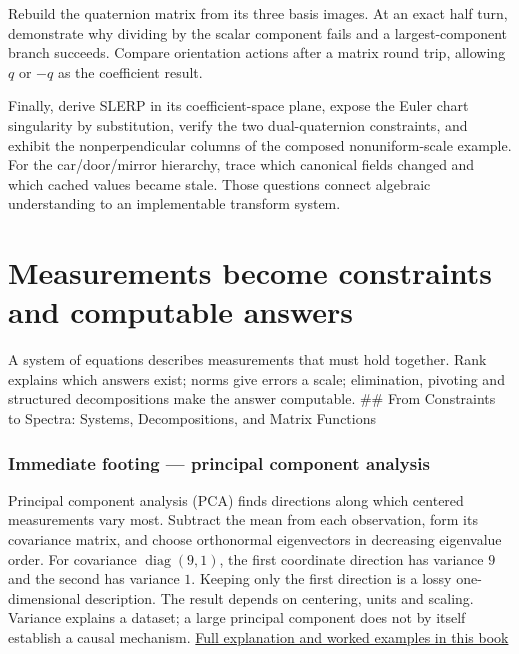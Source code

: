 Rebuild the quaternion matrix from its three basis images. At an exact half turn, demonstrate why dividing by the scalar component fails and a largest-component branch succeeds. Compare orientation actions after a matrix round trip, allowing \(q\) or \(-q\) as the coefficient result.

Finally, derive SLERP in its coefficient-space plane, expose the Euler chart singularity by substitution, verify the two dual-quaternion constraints, and exhibit the nonperpendicular columns of the composed nonuniform-scale example. For the car/door/mirror hierarchy, trace which canonical fields changed and which cached values became stale. Those questions connect algebraic understanding to an implementable transform system.

\section{Measurements become constraints and computable answers}\label{01-foundations-i-ch019-measurements-become-constraints-and-computable-answers}

\hypertarget{01-foundations-i-ch019-measurements-become-constraints-and-computable-answers}{}

A system of equations describes measurements that must hold together. Rank explains which answers exist; norms give errors a scale; elimination, pivoting and structured decompositions make the answer computable. \#\# From Constraints to Spectra: Systems, Decompositions, and Matrix Functions

\subsubsection{Immediate footing --- principal component analysis}\label{01-foundations-i-ch019-immediate-footing-principal-component-analysis}

\hypertarget{01-foundations-i-ch019-immediate-footing-principal-component-analysis}{}

Principal component analysis (PCA) finds directions along which centered measurements vary most. Subtract the mean from each observation, form its covariance matrix, and choose orthonormal eigenvectors in decreasing eigenvalue order. For covariance \(\operatorname{diag}(9,1)\), the first coordinate direction has variance \(9\) and the second has variance \(1\). Keeping only the first direction is a lossy one-dimensional description. The result depends on centering, units and scaling. Variance explains a dataset; a large principal component does not by itself establish a causal mechanism. \hyperref[02-foundations-ii-ch024-pca-turns-a-cloud-of-points-into-measured-variation]{Full explanation and worked examples in this book}

